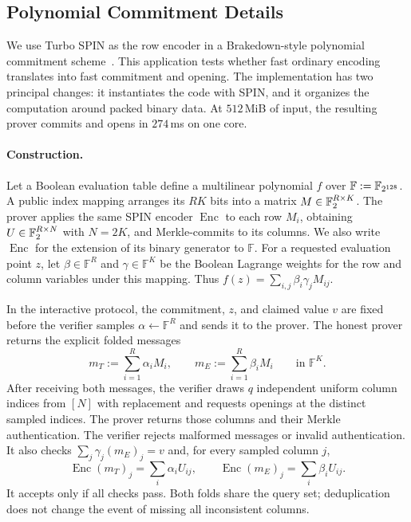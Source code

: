 \subsection{Polynomial Commitment Details}
\label{app:pcs-details}

We use Turbo SPIN as the row encoder in a Brakedown-style polynomial commitment
scheme~\cite{brakedown23}. This application tests whether fast ordinary
encoding translates into fast commitment and opening. The implementation
has two principal changes: it instantiates the code with SPIN, and it
organizes the computation around packed binary data. At $512$\,MiB of
input, the resulting prover commits and opens in $274$\,ms on one core.

\paragraph{Construction.}
Let a Boolean evaluation table define a multilinear polynomial $f$ over
$\mathbb F:=\mathbb F_{2^{128}}$. A public index mapping arranges its $RK$ bits
into a matrix $M\in\mathbb F_2^{R\times K}$. The prover applies the same SPIN
encoder $\operatorname{Enc}$ to each row $M_i$, obtaining
$U\in\mathbb F_2^{R\times N}$ with $N=2K$, and Merkle-commits to its columns.
We also write $\operatorname{Enc}$ for the extension of its binary generator
to $\mathbb F$.
For a requested evaluation point $z$, let $\beta\in\mathbb F^R$ and
$\gamma\in\mathbb F^K$ be the Boolean Lagrange weights for the row and
column variables under this mapping. Thus
$f(z)=\sum_{i,j}\beta_i\gamma_jM_{ij}$.

In the interactive protocol, the commitment, $z$, and claimed value $v$
are fixed before the verifier samples $\alpha\gets\mathbb F^R$ and sends
it to the prover. The honest prover returns the explicit folded messages
\[
  m_T:=\sum_{i=1}^R\alpha_i M_i,
  \qquad
  m_E:=\sum_{i=1}^R\beta_i M_i
  \qquad\text{in }\mathbb F^K.
\]
After receiving both messages, the verifier draws $q$ independent uniform
column indices from $[N]$ with replacement and requests openings at the distinct
sampled indices. The prover returns those columns and their Merkle
authentication. The verifier rejects malformed messages or invalid
authentication. It also checks $\sum_j\gamma_j(m_E)_j=v$ and, for every
sampled column $j$,
\[
  \operatorname{Enc}(m_T)_j=\sum_i\alpha_iU_{ij},
  \qquad
  \operatorname{Enc}(m_E)_j=\sum_i\beta_iU_{ij}.
\]
It accepts only if all checks pass. Both folds share the query set;
deduplication does not change the event of missing all inconsistent columns.

